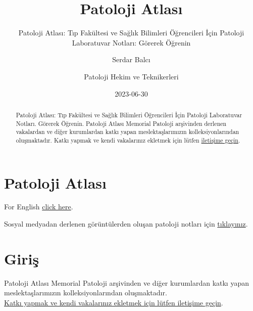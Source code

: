 \documentclass[
  letterpaper,
  DIV=11,
  numbers=noendperiod]{scrreprt}
\title{Patoloji Atlası}
\subtitle{Patoloji Atlası: Tıp Fakültesi ve Sağlık Bilimleri Öğrencileri
İçin Patoloji Laboratuvar Notları: Görerek Öğrenin}
\author{Serdar Balcı \and Patoloji Hekim ve Teknikerleri}
\date{2023-06-30}
\renewcommand*\contentsname{Içindekiler}
\newcommand\contentsname{Içindekiler}
\begin{document}
\maketitle
\begin{abstract}
Patoloji Atlası: Tıp Fakültesi ve Sağlık Bilimleri Öğrencileri İçin
Patoloji Laboratuvar Notları. Görerek Öğrenin. Patoloji Atlası Memorial
Patoloji arşivinden derlenen vakalardan ve diğer kurumlardan katkı yapan
meslektaşlarımızın kolleksiyonlarından oluşmaktadır. Katkı yapmak ve
kendi vakalarınız ekletmek için lütfen
\href{https://www.patolojiatlasi.com/katki.html}{iletişime geçin}.
\end{abstract}
\ifdefined\Shaded\renewenvironment{Shaded}{\begin{tcolorbox}[interior hidden, borderline west={3pt}{0pt}{shadecolor}, sharp corners, enhanced, boxrule=0pt, frame hidden, breakable]}{\end{tcolorbox}}\fi

\renewcommand*\contentsname{İçindekiler}
{
\hypersetup{linkcolor=}
\setcounter{tocdepth}{2}
\tableofcontents
}

\hypertarget{sec-patoloji-atlasi}{%
\chapter*{Patoloji Atlası}\label{sec-patoloji-atlasi}}


For English \href{https://www.patolojiatlasi.com/EN/}{click here}.

Sosyal medyadan derlenen görüntülerden oluşan patoloji notları için
\href{https://www.patolojinotlari.com/}{tıklayınız}.


\hypertarget{sec-giris}{%
\chapter*{Giriş}\label{sec-giris}}


Patoloji Atlası Memorial Patoloji arşivinden ve diğer kurumlardan katkı
yapan meslektaşlarımızın kolleksiyonlarından oluşmaktadır.\\

\href{https://www.patolojiatlasi.com/katki.html}{Katkı yapmak ve kendi
vakalarınız ekletmek için lütfen iletişime geçin}.
\end{document}

